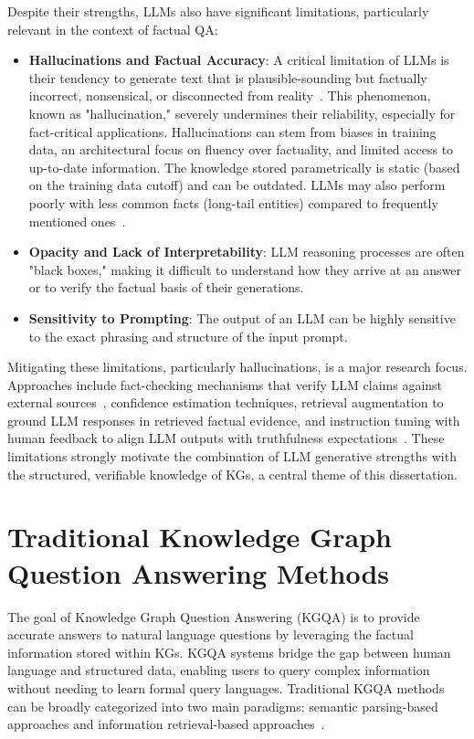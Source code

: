 Despite their strengths, LLMs also have significant limitations, particularly relevant in the context of factual QA:
\begin{itemize}
    \item \textbf{Hallucinations and Factual Accuracy}: A critical limitation of LLMs is their tendency to generate text that is plausible-sounding but factually incorrect, nonsensical, or disconnected from reality~\cite{DBLP:journals/csur/JiLFYSXIBMF23, lin-etal-2022-truthfulqa, DBLP:journals/corr/abs-2401-01313}. This phenomenon, known as "hallucination," severely undermines their reliability, especially for fact-critical applications. Hallucinations can stem from biases in training data, an architectural focus on fluency over factuality, and limited access to up-to-date information. The knowledge stored parametrically is static (based on the training data cutoff) and can be outdated. LLMs may also perform poorly with less common facts (long-tail entities) compared to frequently mentioned ones~\cite{DBLP:conf/acl/MallenAZDKH23}.
    \item \textbf{Opacity and Lack of Interpretability}: LLM reasoning processes are often "black boxes," making it difficult to understand how they arrive at an answer or to verify the factual basis of their generations.
    \item \textbf{Sensitivity to Prompting}: The output of an LLM can be highly sensitive to the exact phrasing and structure of the input prompt.
\end{itemize}
Mitigating these limitations, particularly hallucinations, is a major research focus. Approaches include fact-checking mechanisms that verify LLM claims against external sources~\cite{cohen-etal-2023-lm, min-etal-2023-factscore}, confidence estimation techniques, retrieval augmentation to ground LLM responses in retrieved factual evidence, and instruction tuning with human feedback to align LLM outputs with truthfulness expectations~\cite{DBLP:conf/nips/Ouyang0JAWMZASR22}. These limitations strongly motivate the combination of LLM generative strengths with the structured, verifiable knowledge of KGs, a central theme of this dissertation.

\section{Traditional Knowledge Graph Question Answering Methods}
\label{sec:rw_traditional_kgqa}

The goal of Knowledge Graph Question Answering (KGQA) is to provide accurate answers to natural language questions by leveraging the factual information stored within KGs. KGQA systems bridge the gap between human language and structured data, enabling users to query complex information without needing to learn formal query languages. Traditional KGQA methods can be broadly categorized into two main paradigms: semantic parsing-based approaches and information retrieval-based approaches~\cite{DBLP:journals/aiopen/ZhangLFZ21}.

